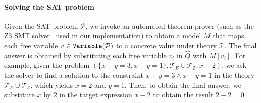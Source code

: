 \documentclass{article}
\theoremstyle{definition}
\newcommand\gd[1]{\todo[color=red!40]{{\bf Greg}: #1}}
\newcommand{\greg}[1]{\textcolor{red}{\textbf{GREG:} #1}}
\newcommand{\satprob}{\mathcal{P}}
\newcommand{\theory}{\mathcal{T}}
\newcommand{\query}{Q}
\begin{document}
\paragraph{Solving the SAT problem}
Given the SAT problem $\satprob$, we invoke an automated theorem prover (such as the Z3 SMT solver~\citep{z3} used in our implementation)  to obtain a model  ${M}$ that maps each free variable $v \in {\tt Variable}(\satprob)$ to a concrete value under theory $\theory$. The final answer is obtained by substituting each free variable $v_i$ in $\hat{\query}$ with $M[v_i]$. For example, given the problem $ (\{x+y=3, x-y=1\}, \theory_{E} \cup \theory_{\mathbb{Z}}, x-2)$,  we ask the solver to find a solution to the constraint $x+y=3 \land x-y=1$ in the theory  $\theory_{E} \cup \theory_{\mathbb{Z}}$, which yields  $x = 2$ and $y=1$. Then, to obtain the final answer, we substitute $x$ by $2$ in the target expression $x-2$ to obtain the result  $2 - 2 = 0$.

\end{document}
